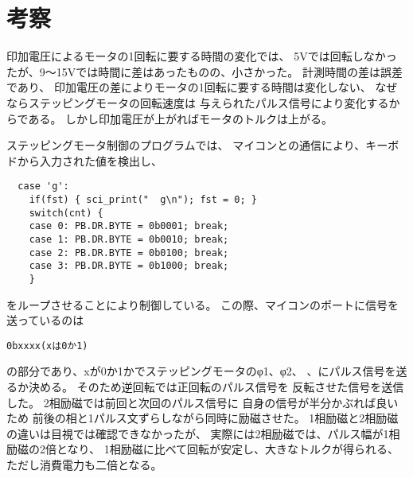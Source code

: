 \documentclass[10pt,a4paper]{jarticle}
\begin{document}
\section{考察}
印加電圧によるモータの1回転に要する時間の変化では、
5Vでは回転しなかったが、9〜15Vでは時間に差はあったものの、小さかった。
計測時間の差は誤差であり、
印加電圧の差によりモータの1回転に要する時間は変化しない、
なぜならステッピングモータの回転速度は
与えられたパルス信号により変化するからである。
しかし印加電圧が上がればモータのトルクは上がる。\par
ステッピングモータ制御のプログラムでは、
マイコンとの通信により、キーボドから入力された値を検出し、
{\small
\begin{verbatim}
  case 'g':
    if(fst) { sci_print("  g\n"); fst = 0; }
    switch(cnt) {
    case 0: PB.DR.BYTE = 0b0001; break;
    case 1: PB.DR.BYTE = 0b0010; break;
    case 2: PB.DR.BYTE = 0b0100; break;
    case 3: PB.DR.BYTE = 0b1000; break;
    }
\end{verbatim}
}
をループさせることにより制御している。
この際、マイコンのポートに信号を送っているのは
{\small
\begin{verbatim}
0bxxxx(xは0か1)
\end{verbatim}
}
の部分であり、xが0か1かでステッピングモータのφ1、φ2、
、にパルス信号を送るか決める。
そのため逆回転では正回転のパルス信号を
反転させた信号を送信した。
2相励磁では前回と次回のパルス信号に
自身の信号が半分かぶれば良いため
前後の相と1パルス文ずらしながら同時に励磁させた。
1相励磁と2相励磁の違いは目視では確認できなかったが、
実際には2相励磁では、パルス幅が1相励磁の2倍となり、
1相励磁に比べて回転が安定し、大きなトルクが得られる、
ただし消費電力も二倍となる。
\end{document}
